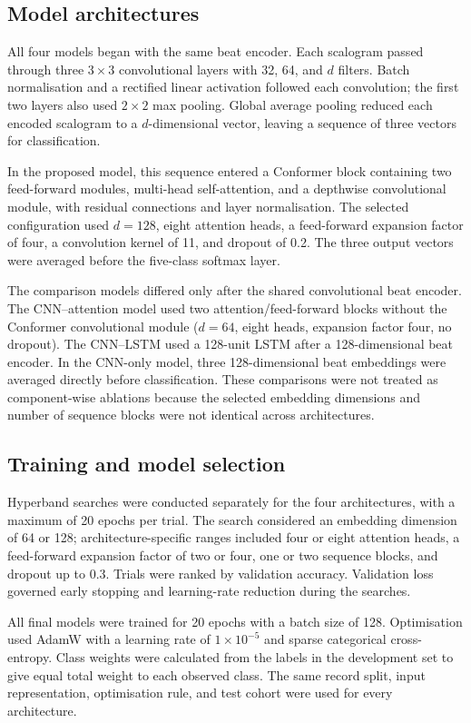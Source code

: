 \subsection{Model architectures}
All four models began with the same beat encoder. Each scalogram passed through three $3\times3$ convolutional layers with 32, 64, and $d$ filters. Batch normalisation and a rectified linear activation followed each convolution; the first two layers also used $2\times2$ max pooling. Global average pooling reduced each encoded scalogram to a $d$-dimensional vector, leaving a sequence of three vectors for classification.

In the proposed model, this sequence entered a Conformer block containing two feed-forward modules, multi-head self-attention, and a depthwise convolutional module, with residual connections and layer normalisation\cite{gulati2020conformer,vaswani2017attention,he2016deep,ba2016layer}. The selected configuration used $d=128$, eight attention heads, a feed-forward expansion factor of four, a convolution kernel of 11, and dropout of 0.2. The three output vectors were averaged before the five-class softmax layer.

The comparison models differed only after the shared convolutional beat encoder. The CNN--attention model used two attention/feed-forward blocks without the Conformer convolutional module ($d=64$, eight heads, expansion factor four, no dropout). The CNN--LSTM used a 128-unit LSTM after a 128-dimensional beat encoder. In the CNN-only model, three 128-dimensional beat embeddings were averaged directly before classification. These comparisons were not treated as component-wise ablations because the selected embedding dimensions and number of sequence blocks were not identical across architectures.

\subsection{Training and model selection}
Hyperband searches were conducted separately for the four architectures, with a maximum of 20 epochs per trial\cite{li2018hyperband}. The search considered an embedding dimension of 64 or 128; architecture-specific ranges included four or eight attention heads, a feed-forward expansion factor of two or four, one or two sequence blocks, and dropout up to 0.3. Trials were ranked by validation accuracy. Validation loss governed early stopping and learning-rate reduction during the searches.

All final models were trained for 20 epochs with a batch size of 128. Optimisation used AdamW with a learning rate of $1\times10^{-5}$ and sparse categorical cross-entropy. Class weights were calculated from the labels in the development set to give equal total weight to each observed class. The same record split, input representation, optimisation rule, and test cohort were used for every architecture.

